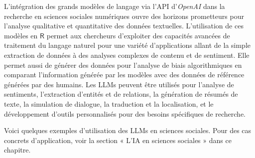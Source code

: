 \documentclass[
  letterpaper,
  DIV=11,
  numbers=noendperiod,
  oneside]{scrreprt}
\begin{document}
L'intégration des grands modèles de langage via l'API d'\emph{OpenAI}
dans la recherche en sciences sociales numériques ouvre des horizons
prometteurs pour l'analyse qualitative et quantitative des données
textuelles. L'utilisation de ces modèles en \(\textsf{R}\) permet aux
chercheurs d'exploiter des capacités avancées de traitement du langage
naturel pour une variété d'applications allant de la simple extraction
de données à des analyses complexes de contenu et de sentiment. Elle
permet aussi de générer des données pour l'analyse de biais
algorithmiques en comparant l'information générée par les modèles avec
des données de référence générées par des humains. Les LLMs peuvent être
utilisés pour l'analyse de sentiments, l'extraction d'entités et de
relations, la génération de résumés de texte, la simulation de dialogue,
la traduction et la localisation, et le développement d'outils
personnalisés pour des besoins spécifiques de recherche.

Voici quelques exemples d'utilisation des LLMs en sciences sociales.
Pour des cas concrets d'application, voir la section « L'IA en sciences
sociales » dans ce chapitre.
\end{document}
